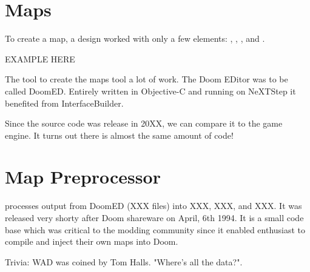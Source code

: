 

\section{Maps}
To create a map, a design worked with only a few elements: , , , and .\\
\par
EXAMPLE HERE\\
\par

The tool to create the maps tool a lot of work. The Doom EDitor was to be called DoomED. Entirely written in Objective-C and running on NeXTStep it benefited from InterfaceBuilder.\\
\par
Since the source code was release in 20XX, we can compare it to the game engine. It turns out there is almost the same amount of code!\\
\par
{}

\par
{}
\par
{}
\par
{}
\par
{}
\par





\section{Map Preprocessor}
 processes output from DoomED (XXX files) into XXX, XXX, and XXX. It was released very shorty after Doom shareware on April, 6th 1994. It is a small code base which was critical to the modding community since it enabled enthusiast to compile and inject their own maps into Doom.\\
\par
{}
\par
Trivia: WAD was coined by Tom Halls. "Where's all the data?".\\
\par

